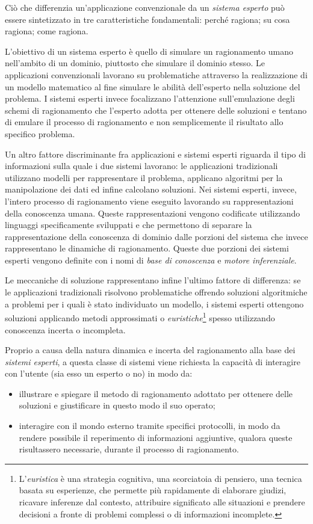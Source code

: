 Ciò che differenzia un'applicazione convenzionale da un \emph{sistema esperto} può essere sintetizzato in tre caratteristiche fondamentali: perché ragiona; su cosa ragiona; come ragiona.

L'obiettivo di un sistema esperto è quello di simulare un ragionamento umano nell'ambito di un dominio, piuttosto che simulare il dominio stesso. Le applicazioni convenzionali lavorano su problematiche attraverso la realizzazione di un modello matematico al fine simulare le abilità dell'esperto nella soluzione del problema. I sistemi esperti invece focalizzano l'attenzione sull'emulazione degli schemi di ragionamento che l'esperto adotta per ottenere delle soluzioni e tentano di emulare il processo di ragionamento e non semplicemente il risultato allo specifico problema.

Un altro fattore discriminante fra applicazioni e sistemi esperti riguarda il tipo di informazioni sulla quale i due sistemi lavorano: le applicazioni tradizionali utilizzano modelli per rappresentare il problema, applicano algoritmi per la manipolazione dei dati ed infine calcolano soluzioni. Nei sistemi esperti, invece, l'intero processo di ragionamento viene eseguito lavorando su rappresentazioni della conoscenza umana. Queste rappresentazioni vengono codificate utilizzando linguaggi specificamente sviluppati e che permettono di separare la rappresentazione della conoscenza di dominio dalle porzioni del sistema che invece rappresentano le dinamiche di ragionamento. Queste due porzioni dei sistemi esperti vengono definite con i nomi di \emph{base di conoscenza} e \emph{motore inferenziale}.

Le meccaniche di soluzione rappresentano infine l'ultimo fattore di differenza: se le applicazioni tradizionali risolvono problematiche offrendo soluzioni algoritmiche a problemi per i quali è stato individuato un modello, i sistemi esperti ottengono soluzioni applicando metodi approssimati o \emph{euristiche}\footnote{L’\emph{euristica} è una strategia cognitiva, una scorciatoia di pensiero, una tecnica basata su esperienze, che permette più rapidamente di elaborare giudizi, ricavare inferenze dal contesto, attribuire significato alle situazioni e prendere decisioni a fronte di problemi complessi o di informazioni incomplete.} spesso utilizzando conoscenza incerta o incompleta.

Proprio a causa della natura dinamica e incerta del ragionamento alla base dei \emph{sistemi esperti}, a questa classe di sistemi viene richiesta la capacità di interagire con l'utente (sia esso un esperto o no) in modo da:
\begin{itemize}
	\item illustrare e spiegare il metodo di ragionamento adottato per ottenere delle soluzioni e giustificare in questo modo il suo operato; 
	\item interagire con il mondo esterno tramite specifici protocolli, in modo da rendere possibile il reperimento di informazioni aggiuntive, qualora queste risultassero necessarie, durante il processo di ragionamento.
\end{itemize}

